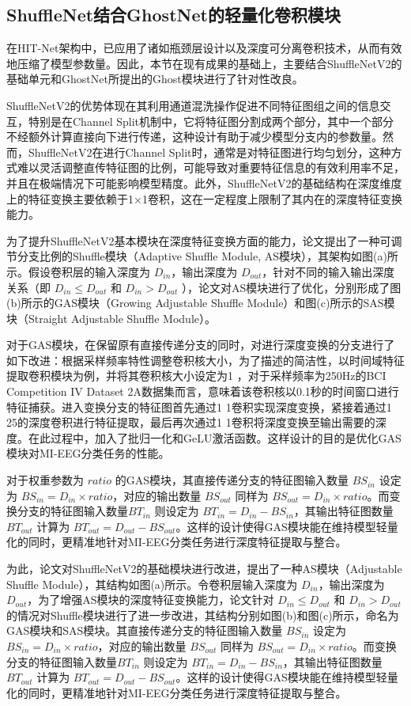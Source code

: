 \subsection{ShuffleNet结合GhostNet的轻量化卷积模块}

在HIT-Net架构中，已应用了诸如瓶颈层设计以及深度可分离卷积技术，从而有效地压缩了模型参数量。因此，本节在现有成果的基础上，主要结合ShuffleNetV2的基础单元和GhostNet所提出的Ghost模块进行了针对性改良。

ShuffleNetV2的优势体现在其利用通道混洗操作促进不同特征图组之间的信息交互，特别是在Channel Split机制中，它将特征图分割成两个部分，其中一个部分不经额外计算直接向下进行传递，这种设计有助于减少模型分支内的参数量。然而，ShuffleNetV2在进行Channel Split时，通常是对特征图进行均匀划分，这种方式难以灵活调整直传特征图的比例，可能导致对重要特征信息的有效利用率不足，并且在极端情况下可能影响模型精度。此外，ShuffleNetV2的基础结构在深度维度上的特征变换主要依赖于1×1卷积，这在一定程度上限制了其内在的深度特征变换能力。

为了提升ShuffleNetV2基本模块在深度特征变换方面的能力，论文提出了一种可调节分支比例的Shuffle模块（Adaptive Shuffle Module, AS模块），其架构如图(a)所示。假设卷积层的输入深度为 \(D_{in}\)，输出深度为 \(D_{out}\)，针对不同的输入输出深度关系（即 \(D_{in} \le D_{out}\) 和 \(D_{in} > D_{out}\) ），论文对AS模块进行了优化，分别形成了图(b)所示的GAS模块（Growing Adjustable Shuffle Module）和图(c)所示的SAS模块（Straight Adjustable Shuffle Module）。

对于GAS模块，在保留原有直接传递分支的同时，对进行深度变换的分支进行了如下改进：根据采样频率特性调整卷积核大小，为了描述的简洁性，以时间域特征提取卷积模块为例，并将其卷积核大小设定为1 ，对于采样频率为250Hz的BCI Competition IV Dataset 2A数据集而言，意味着该卷积核以0.1秒的时间窗口进行特征捕获。进入变换分支的特征图首先通过1 \times 1卷积实现深度变换，紧接着通过1 \times 25的深度卷积进行特征提取，最后再次通过1 \times 1卷积将深度变换至输出需要的深度。在此过程中，加入了批归一化和GeLU激活函数。这样设计的目的是优化GAS模块对MI-EEG分类任务的性能。

对于权重参数为 \(ratio\) 的GAS模块，其直接传递分支的特征图输入数量 \(BS_{in}\) 设定为 \(BS_{in} = D_{in} \times ratio\)，对应的输出数量 \(BS_{out}\) 同样为 \(BS_{out} = D_{in} \times ratio\)。而变换分支的特征图输入数量\(BT_{in}\) 则设定为 \(BT_{in} = D_{in} - BS_{in}\)，其输出特征图数量 \(BT_{out}\) 计算为 \(BT_{out} = D_{out} - BS_{out}\)。这样的设计使得GAS模块能在维持模型轻量化的同时，更精准地针对MI-EEG分类任务进行深度特征提取与整合。

为此，论文对ShuffleNetV2的基础模块进行改进，提出了一种AS模块（Adjustable Shuffle Module），其结构如图(a)所示。令卷积层输入深度为 \(D_{in}\)，输出深度为 \(D_{out}\)，为了增强AS模块的深度特征变换能力，论文针对 \(D_{in} \le D_{out}\) 和 \(D_{in} > D_{out}\) 的情况对Shuffle模块进行了进一步改进，其结构分别如图(b)和图(c)所示，命名为GAS模块和SAS模块。其直接传递分支的特征图输入数量 \(BS_{in}\) 设定为 \(BS_{in} = D_{in} \times ratio\)，对应的输出数量 \(BS_{out}\) 同样为 \(BS_{out} = D_{in} \times ratio\)。而变换分支的特征图输入数量\(BT_{in}\) 则设定为 \(BT_{in} = D_{in} - BS_{in}\)，其输出特征图数量 \(BT_{out}\) 计算为 \(BT_{out} = D_{out} - BS_{out}\)。这样的设计使得GAS模块能在维持模型轻量化的同时，更精准地针对MI-EEG分类任务进行深度特征提取与整合。

